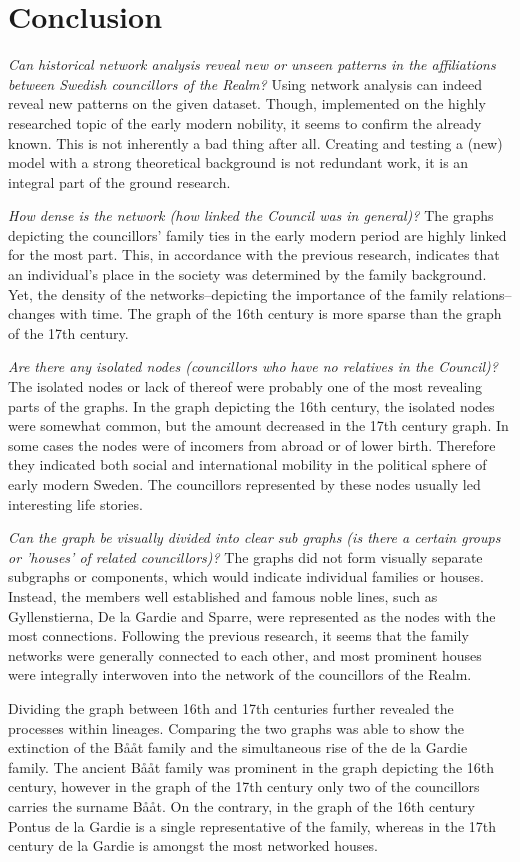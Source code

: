 \section{Conclusion}
\textit{Can historical network analysis reveal new or unseen patterns in the affiliations between Swedish councillors of the Realm?} Using network analysis can indeed reveal new patterns on the given dataset. Though, implemented on the highly researched topic of the early modern nobility, it seems to confirm the already known. This is not inherently a bad thing after all. Creating and testing a (new) model with a strong theoretical background is not redundant work, it is an integral part of the ground research. 

\textit{How dense is the network (how linked the Council was in general)?} The graphs depicting the councillors' family ties in the early modern period are highly linked for the most part. This, in accordance with the previous research, indicates that an individual's place in the society was determined by the family background. Yet, the density of the networks–depicting the importance of the family relations–changes with time. The graph of the 16th century is more sparse than the graph of the 17th century.

\textit{Are there any isolated nodes (councillors who have no relatives in the Council)?} The isolated nodes or lack of thereof were probably one of the most revealing parts of the graphs. In the graph depicting the 16th century, the isolated nodes were somewhat common, but the amount decreased in the 17th century graph. In some cases the nodes were of incomers from abroad or of lower birth. Therefore they indicated both social and international mobility in the political sphere of early modern Sweden. The councillors represented by these nodes usually led interesting life stories.

\textit{Can the graph be visually divided into clear sub graphs (is there a certain groups or 'houses' of related councillors)?} The graphs did not form visually separate subgraphs or components, which would indicate individual families or houses. Instead, the members well established and famous noble lines, such as Gyllenstierna, De la Gardie and Sparre, were represented as the nodes with the most connections. Following the previous research, it seems that the family networks were generally connected to each other, and most prominent houses were integrally interwoven into the network of the councillors of the Realm.

Dividing the graph between 16th and 17th centuries further revealed the processes within lineages. Comparing the two graphs was able to show the extinction of the Bååt family and the simultaneous rise of the de la Gardie family. The ancient Bååt family was prominent in the graph depicting the 16th century, however in the graph of the 17th century only two of the councillors carries the surname Bååt. On the contrary, in the graph of the 16th century Pontus de la Gardie is a single representative of the family, whereas in the 17th century de la Gardie is amongst the most networked houses.

